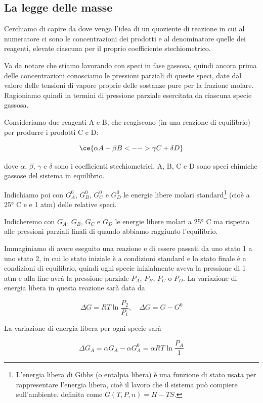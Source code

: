 \subsection{La legge delle masse}
Cerchiamo di capire da dove venga l'idea di un quoziente di reazione in cui al numeratore ci sono le concentrazioni dei prodotti e al denominatore quelle dei reagenti, elevate ciascuna per il proprio coefficiente stechiometrico.

Va da notare che stiamo lavorando con speci in fase gassosa, quindi ancora prima delle concentrazioni conosciamo le pressioni parziali di queste speci, date dal valore delle tensioni di vapore proprie delle sostanze pure per la frazione molare. Ragioniamo quindi in termini di pressione parziale esercitata da ciascuna specie gassosa.

Consideriamo due reagenti A e B, che reagiscono (in una reazione di equilibrio) per produrre i prodotti C e D:

$$\ce{\alpha A + \beta B <--> \gamma C + \delta D}$$

dove $\alpha$, $\beta$, $\gamma$ e $\delta$ sono i coefficienti stechiometrici. A, B, C e D sono speci chimiche gassose del sistema in equilibrio.

Indichiamo poi con $G_A^0$, $G_B^0$, $G_C^0$ e $G_D^0$ le energie libere molari standard\footnote{L'energia libera di Gibbs (o entalpia libera) è una funzione di stato usata per rappresentare l'energia libera, cioè il lavoro che il sistema può compiere sull'ambiente. \E definita come $G(T,P,n)=H-TS$.} (cioè a 25° C e e 1 atm) delle relative speci.

Indicheremo con $G_A$, $G_B$, $G_C$ e $G_D$ le energie libere molari a 25° C ma rispetto alle pressioni parziali finali di quando abbiamo raggiunto l'equilibrio.

Immaginiamo di avere eseguito una reazione e di essere passati da uno stato 1 a uno stato 2, in cui lo stato iniziale è a condizioni standard e lo stato finale è a condizioni di equilibrio, quindi ogni specie inizialmente aveva la pressione di 1 atm e alla fine avrà la pressione parziale $P_A$, $P_B$, $P_C$ o $P_D$. La variazione di energia libera in questa reazione sarà data da

$$\Delta G = RT \ln \frac{P_2}{P_1}, \quad \Delta G = G - G^0$$

La variazione di energia libera per ogni specie sarà

$$\Delta G_A = \alpha G_A - \alpha G_A^0 = \alpha RT \ln \frac{P_A}{1}$$

